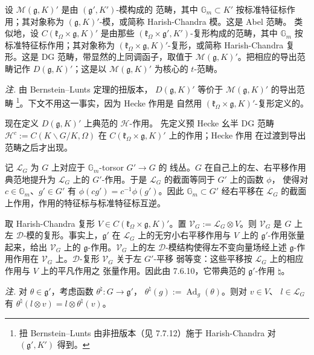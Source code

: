 设 $\mathcal{M}(\mathfrak{g},K)'$ 是由 $(\mathfrak{g}',K')$-模构成的
范畴，其中 $\mathbb{G}_m\subset K'$ 按标准特征标作用；其对象称为
$(\mathfrak{g},K)'$-模，或简称 Harish-Chandra 模。这是 Abel 范畴。
类似地，设 $C(\mathfrak{k}_\Omega\times\mathfrak{g},K)'$ 是由那些
$(\mathfrak{k}_\Omega\times\mathfrak{g}',K')$-复形构成的范畴，其中
$\mathbb{G}_m$ 按标准特征标作用；其对象称为
$(\mathfrak{k}_\Omega\times\mathfrak{g},K)'$-复形，或简称
Harish-Chandra 复形。这是 DG 范畴，带显然的上同调函子，取值于
$\mathcal{M}(\mathfrak{g},K)'$。把相应的导出范畴记作
$D(\mathfrak{g},K)'$；这是以 $\mathcal{M}(\mathfrak{g},K)'$ 为核心的
$t$-范畴。

\emph{注.} 由 Bernstein--Lunts 定理的扭版本，
$D(\mathfrak{g},K)'$ 等价于 $\mathcal{M}(\mathfrak{g},K)'$ 的导出范畴
\footnote{扭 Bernstein--Lunts 由非扭版本（见 7.7.12）施于 Harish-Chandra
对 $(\mathfrak{g}',K')$ 得到。}。下文不用这一事实，因为 Hecke 作用是
自然用 $(\mathfrak{k}_\Omega\times\mathfrak{g},K)'$-复形定义的。


 现在定义 $D(\mathfrak{g},K)'$ 上典范的 $\mathcal{H}$-作用。
先定义预 Hecke 幺半 DG 范畴 $\mathcal{H}^c:=C(K\backslash G/K,\Omega)$
在 $C(\mathfrak{k}_\Omega\times\mathfrak{g},K)'$ 上的作用；Hecke 作用
在过渡到导出范畴之后才出现。

记 $\mathcal{L}_G$ 为 $G$ 上对应于 $\mathbb{G}_m$-torsor $G'\to G$ 的
线丛。$G$ 在自己上的左、右平移作用典范地提升为 $\mathcal{L}_G$ 上的
$G'$-作用。于是 $\mathcal{L}_G$ 的截面等同于 $G'$ 上的函数 $\phi$，
使得对 $c\in\mathbb{G}_m$、$g'\in G'$ 有
$\phi(cg')=c^{-1}\phi(g')$。因此 $\mathbb{G}_m\subset G'$ 经右平移在
$\mathcal{L}_G$ 的截面上作用，作用的特征标与标准特征标互逆。

取 Harish-Chandra 复形
$V\in C(\mathfrak{k}_\Omega\times\mathfrak{g},K)'$。置
$\mathcal{V}_G:=\mathcal{L}_G\otimes V$。则 $\mathcal{V}_G$ 是 $G$ 上
左 $\mathcal{D}$-模的复形。事实上，$\mathfrak{g}'$ 在 $\mathcal{L}_G$
上的无穷小右平移作用与 $V$ 上的 $\mathfrak{g}'$-作用张量起来，给出
$\mathcal{V}_G$ 上的 $\mathfrak{g}$-作用。$\mathcal{V}_G$ 上的左
$\mathcal{D}$-模结构使得左不变向量场经上述 $\mathfrak{g}$-作用作用在
$\mathcal{V}_G$ 上。$\mathcal{D}$-复形 $\mathcal{V}_G$ 关于左 $G'$-平移
弱等变：这些平移按 $\mathcal{L}_G$ 上的相应作用与 $V$ 上的平凡作用之
张量作用。因此由 7.6.10，它带典范的 $\mathfrak{g}'$-作用 $\natural$。

\emph{注.} 对 $\theta\in\mathfrak{g}'$，考虑函数
$\theta^{\natural}:G\to\mathfrak{g}'$，
$\theta^{\natural}(g):=\operatorname{Ad}_g(\theta)$。则对 $v\in V$、
$l\in\mathcal{L}_G$ 有
$\theta^{\natural}(l\otimes v)=l\otimes\theta^{\natural}(v)$。

